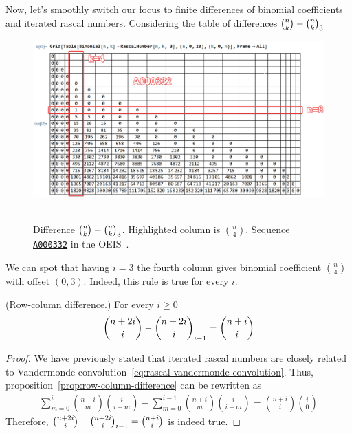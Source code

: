 Now, let's smoothly switch our focus to finite differences of binomial coefficients and iterated rascal numbers.
Considering the table of differences $\binom{n}{k}-\binom{n}{k}_{3}$
\begin{figure}[H]
    \centering
    \includegraphics[width=1\textwidth]{img/01_Difference_Binomial_Rascal_i_3_BinomialCoefficients}
    ~\caption{Difference $\binom{n}{k}-\binom{n}{k}_{3}$.
    Highlighted column is $\binom{n}{4}$.
    Sequence \href{https://oeis.org/A000332}{\texttt{A000332}} in the OEIS~\cite{sloane2009binomial}.}
    \label{fig:difference-binomial-rascal-i-3}
\end{figure}
We can spot that having $i=3$ the fourth column gives binomial coefficient $\binom{n}{4}$ with offset $(0,3)$.
Indeed, this rule is true for every $i$.
\begin{proposition}
    \label{prop:row-column-difference}
    (Row-column difference.) For every $i\geq0$
    \begin{align*}
        \binom{n+2i}{i} - \binom{n+2i}{i}_{i-1} = \binom{n+i}{i}
    \end{align*}
    \begin{proof}
        We have previously stated that iterated rascal numbers are
        closely related to Vandermonde convolution~\eqref{eq:rascal-vandermonde-convolution}.
        Thus, proposition~\eqref{prop:row-column-difference} can be rewritten as
        \begin{align*}
            \sum_{m=0}^{i} \binom{n+i}{m} \binom{i}{i-m} - \sum_{m=0}^{i-1} \binom{n+i}{m} \binom{i}{i-m} = \binom{n+i}{i} \binom{i}{0}
        \end{align*}
        Therefore, $\binom{n+2i}{i} - \binom{n+2i}{i}_{i-1} = \binom{n+i}{i}$ is indeed true.
    \end{proof}
\end{proposition}
